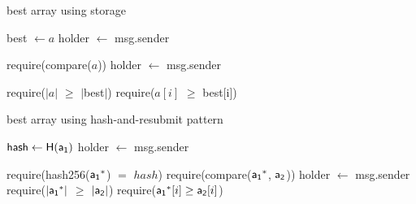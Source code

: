 \begin{algorithm}
    \caption{\label{alg:game-storage}\textsf{best array} using storage}
    \begin{algorithmic}[1]

        \State \textsf{best} $\gets a$
            \State \textsf{holder $\gets$ msg.sender}
        \EndFunction

            \State \textsf{require}(\textsf{compare}($a$))
            \State \textsf{holder} $\gets$ \textsf{msg.sender}
        \EndFunction

            \State \textsf{require}($|a|$ $\geq$ $|$\textsf{best}$|$)
            \State \textsf{require}($a[i]$ $\geq$ \textsf{best}[i])
            \EndFor
            \State {}
        \EndFunction
        \EndContract
        \vskip8pt
    \end{algorithmic}
\end{algorithm}

\begin{algorithm}
    \caption{\label{alg:game-memory}\textsf{best array} using hash-and-resubmit pattern}
    \begin{algorithmic}[1]

        \State $\textsf{hash} \gets \textsf{H}(\mathsf{a_1})$
            \State \textsf{holder} $\gets$ \textsf{msg.sender}
        \EndFunction

    \State \textsf{require}(\textsf{hash256}($\mathsf{a_1}^*$) $=$ $hash$)
        \State \textsf{require}(\textsf{compare}($\mathsf{a_1}^*$, $\mathsf{a_2}$))
        \State \textsf{holder} $\gets$ \textsf{msg.sender}
    \EndFunction
        \State \textsf{require}($|\mathsf{a_1}^*|$ $\geq$ $|\mathsf{a_2}|$)
            \State \textsf{require}($\mathsf{a_1}^*[i] \geq \mathsf{a_2}[i]$)
        \EndFor
    \EndFunction
    \State {}
    \EndContract
    \vskip8pt
    \end{algorithmic}
\end{algorithm}
